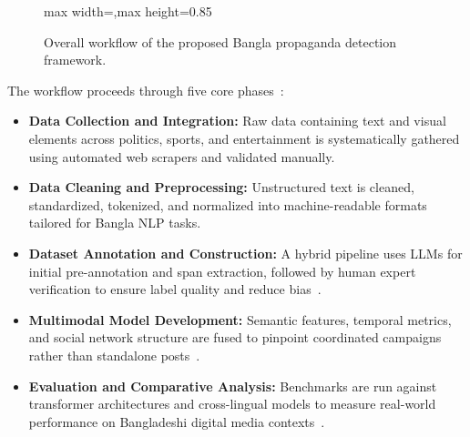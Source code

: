 \documentclass[12pt,a4paper]{report}
\begin{document}
\begin{figure}[H]
\begin{adjustbox}{max width=\textwidth,max height=0.85\textheight}
\end{adjustbox}
\caption{Overall workflow of the proposed Bangla propaganda detection framework.}
\label{fig:workflow}
\end{figure}

The workflow proceeds through five core phases~\cite{ng2023}:
\begin{itemize}
  \item \textbf{Data Collection and Integration:} Raw data containing text and
        visual elements across politics, sports, and entertainment is
        systematically gathered using automated web scrapers and validated
        manually.
  \item \textbf{Data Cleaning and Preprocessing:} Unstructured text is cleaned,
        standardized, tokenized, and normalized into machine-readable formats
        tailored for Bangla NLP tasks.
  \item \textbf{Dataset Annotation and Construction:} A hybrid pipeline uses LLMs
        for initial pre-annotation and span extraction, followed by human expert
        verification to ensure label quality and reduce
        bias~\cite{hossain2020}.
  \item \textbf{Multimodal Model Development:} Semantic features, temporal metrics,
        and social network structure are fused to pinpoint coordinated campaigns
        rather than standalone posts~\cite{ng2023}.
  \item \textbf{Evaluation and Comparative Analysis:} Benchmarks are run against
        transformer architectures and cross-lingual models to measure real-world
        performance on Bangladeshi digital media contexts~\cite{hossain2020}.
\end{itemize}
\end{document}
